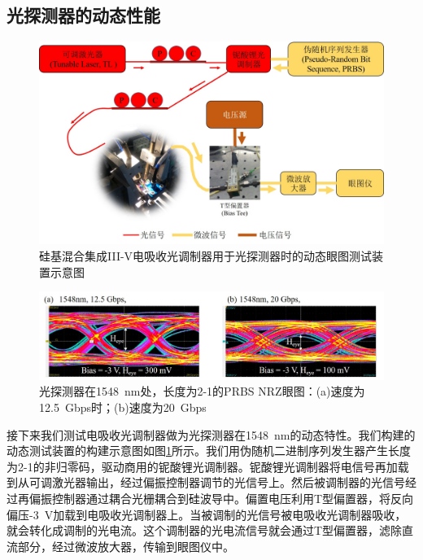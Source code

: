 \subsection{光探测器的动态性能}
\begin{figure}[htb]
	\centering
	\includegraphics[width=15cm]{./Pictures/chapt4_dynamic_measure_setup_pd.jpg}
	\caption{硅基混合集成III-V电吸收光调制器用于光探测器时的动态眼图测试装置示意图}
	\label{chapt4_dynamic_measure_setup_pd}
\end{figure}
\begin{figure}[htb]
	\centering
	\includegraphics[width=15cm]{./Pictures/chapt4_eyediagram_pd.jpg}
	\caption{光探测器在1548~nm处，长度为2-1的PRBS NRZ眼图：(a)速度为12.5~Gbps时；(b)速度为20~Gbps}
	\label{chapt4_eyediagram_pd}
\end{figure}

接下来我们测试电吸收光调制器做为光探测器在1548~nm的动态特性。我们构建的动态测试装置的构建示意图如图\ref{chapt4_dynamic_measure_setup_pd}所示。我们用伪随机二进制序列发生器产生长度为2-1的非归零码，驱动商用的铌酸锂光调制器。铌酸锂光调制器将电信号再加载到从可调激光器输出，经过偏振控制器调节的光信号上。然后被调制器的光信号经过再偏振控制器通过耦合光栅耦合到硅波导中。偏置电压利用T型偏置器，将反向偏压-3~V加载到电吸收光调制器上。当被调制的光信号被电吸收光调制器吸收，就会转化成调制的光电流。这个调制器的光电流信号就会通过T型偏置器，滤除直流部分，经过微波放大器，传输到眼图仪中。

